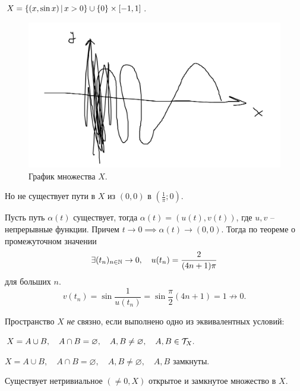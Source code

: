 \begin{example}
    $X = \{(x,\sin x)\,|\, x>0\}\cup\{0\}\times[-1,1]$. 
    \begin{figure}[ht]
        \centering
        \includegraphics[width=0.75\linewidth]{graphics/sinx_x-graph.png}
        \caption{График множества $X$.}
    \end{figure}

    Но не существует пути в $X$ из $(0,0)$ в $\left(\frac 1 \pi; 0\right).$

    Пусть путь $\alpha(t)$ существует, тогда \(\alpha(t) = (u(t), v(t))\), где $u, v$ -- непрерывные функции. Причем $t\to 0\implies \alpha(t) \to (0,0).$ Тогда по теореме о промежуточном значении \begin{equation}
        \exists (t_n)_{n\in\mathbb N}\to 0, \quad u(t_n) = \frac{2}{(4n+1)\pi} 
    \end{equation}для больших $n$. \begin{equation}
        v(t_n) = \sin{\frac 1 {u(t_n)} = \sin{\frac{\pi}{2}} (4n+1)} =1 \not\to 0.
    \end{equation}
\end{example}

\begin{definition}
    [Связность]
    Пространство $X$ \emph{не} связно, если выполнено одно из эквивалентных условий: \begin{conditions}
        \item $X = A \cup B, \quad A\cap B = \varnothing, \quad A, B\neq\varnothing, \quad A, B \in \mathcal T_X.$
        \item $X = A \cup B, \quad A\cap B = \varnothing, \quad A, B\neq\varnothing, \quad A, B \text{ замкнуты}.$
        \item Существует нетривиальное $(\neq 0, X)$ открытое и замкнутое множество в $X$.
    \end{conditions}
\end{definition}


